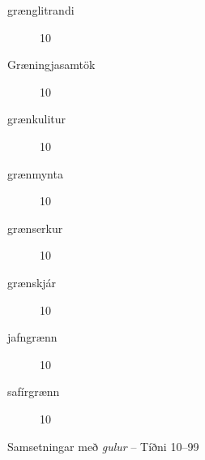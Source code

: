 \documentclass[../samsetningasafn.tex]{subfiles}
\begin{document}
\begin{bigwordlist}
\begin{footnotesize}
\begin{multicols}{4}
\begin{description}
		\item [grænglitrandi]	10
		\item [Græningjasamtök]	10
		\item [grænkulitur]	10
		\item [grænmynta]	10
		\item [grænserkur]	10
		\item [grænskjár]		10
		\item [jafngrænn]	10
		\item [safírgrænn]	10
	\end{description}
\end{multicols}
\end{footnotesize}
	
\label{listi:graen99}
\caption{Samsetningar með \textit{gulur} -- Tíðni 10--99}
\end{bigwordlist}

\end{document}
